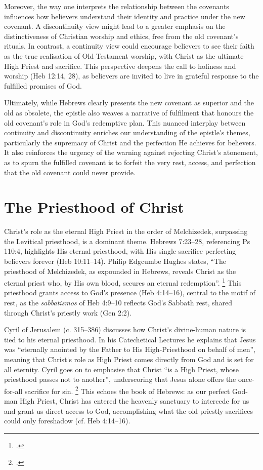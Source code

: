 \documentclass[12pt]{article}
\def\apos{^^27}         %
\def\jesus{Yeshua}
\def\christ{the Messiah}
\def\Christ{The Messiah}
\def\jesus{Jesus}
\def\christ{Christ}
\def\Christ{Christ}
\begin{document}
Moreover, the way one interprets the relationship between the covenants
influences how believers understand their identity and practice under the new
covenant. A discontinuity view might lead to a greater emphasis on the
distinctiveness of Christian worship and ethics, free from the old
covenant\apos{}s rituals. In contrast, a continuity view could encourage
believers to see their faith as the true realisation of Old Testament worship,
with \christ{} as the ultimate High Priest and sacrifice. This perspective
deepens the call to holiness and worship (Heb 12:14, 28), as believers are
invited to live in grateful response to the fulfilled promises of God.

Ultimately, while Hebrews clearly presents the new covenant as superior and the
old as obsolete, the epistle also weaves a narrative of fulfilment that honours
the old covenant\apos{}s role in God\apos{}s redemptive plan.
%
This nuanced interplay between continuity and discontinuity enriches our
understanding of the epistle\apos{}s themes, particularly the supremacy of
\christ{} and the perfection He achieves for believers.
%
It also reinforces the urgency of the warning against rejecting
\christ{}\apos{}s atonement, as to spurn the fulfilled covenant is to forfeit
the very rest, access, and perfection that the old covenant could never provide.

\section{The Priesthood of \Christ{}} \Christ{}\apos{}s role as the eternal High
Priest in the order of Melchizedek, surpassing the Levitical priesthood, is a
dominant theme.
%
Hebrews 7:23--28, referencing Ps 110:4, highlights His eternal priesthood, with
His single sacrifice perfecting believers forever (Heb 10:11--14).
%
Philip Edgcumbe Hughes states, ``The
priesthood of Melchizedek, as expounded in Hebrews, reveals \christ{} as the
eternal priest who, by His own blood, secures an eternal redemption''.
\footcite[258]{Hughes1977}
This priesthood grants access to God\apos{}s presence (Heb 4:14--16),
central to the motif of rest, as the \emph{sabbatismos} of Heb 4:9--10
reflects God\apos{}s Sabbath rest, shared through \christ{}\apos{}s priestly
work (Gen 2:2).

Cyril of Jerusalem (c. 315–386) discusses how \christ{}\apos{}s divine-human
nature is tied to his eternal priesthood. In his Catechetical Lectures he
explains that \jesus{} was ``eternally anointed by the Father to His
High-Priesthood on behalf of men'', meaning that \christ{}\apos{}s role as High
Priest comes directly from God and is set for all eternity.
%
Cyril goes on to emphasise that \christ{} ``is a High Priest, whose priesthood
passes not to another'', underscoring that \jesus{} alone offers the
once-for-all sacrifice for sin. \footcite[Lecture 12]{Cyril1894}
%
This echoes the book of Hebrews: as our perfect God-man High Priest, \christ{}
has entered the heavenly sanctuary to intercede for us and grant us direct
access to God, accomplishing what the old priestly sacrifices could only
foreshadow (cf.  Heb 4:14–16).
\end{document}
